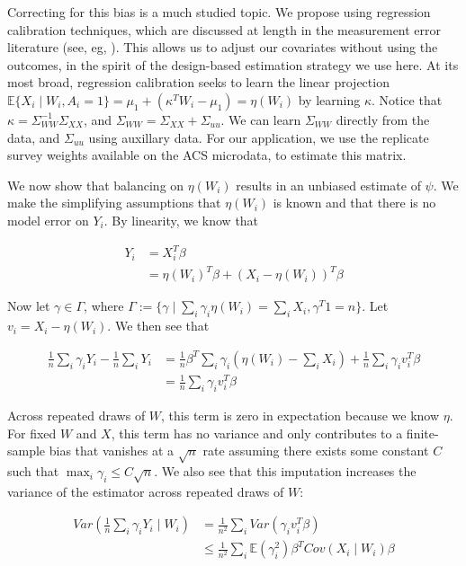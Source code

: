 \documentclass[12pt]{article}
\begin{document}
Correcting for this bias is a much studied topic. We propose using regression calibration techniques, which are discussed at length in the measurement error literature (see, eg, \cite{carroll2006measurement}). This allows us to adjust our covariates without using the outcomes, in the spirit of the design-based estimation strategy we use here. At its most broad, regression calibration seeks to learn the linear projection $\mathbb{E}\{X_i \mid W_i, A_i = 1\} = \mu_1 + (\kappa^T W_i - \mu_1) = \eta(W_i)$ by learning $\kappa$. Notice that $\kappa = \Sigma_{WW}^{-1}\Sigma_{XX}$, and $\Sigma_{WW} = \Sigma_{XX} + \Sigma_{uu}$. We can learn $\Sigma_{WW}$ directly from the data, and $\Sigma_{uu}$ using auxillary data. For our application, we use the replicate survey weights available on the ACS microdata, to estimate this matrix. 

We now show that balancing on $\eta(W_i)$ results in an unbiased estimate of $\psi$. We make the simplifying assumptions that $\eta(W_i)$ is known and that there is no model error on $Y_i$. By linearity, we know that

\begin{align*}
Y_i &= X_i^T\beta \\
&= \eta(W_i)^T\beta + (X_i - \eta(W_i))^T\beta
\end{align*}

Now let $\gamma \in \Gamma$, where $\Gamma := \{\gamma \mid \sum_i \gamma_i \eta(W_i) = \sum_i X_i, \gamma^T1 = n\}$. Let $v_i = X_i - \eta(W_i)$. We then see that

\begin{align*}
    \frac{1}{n}\sum_{i}\gamma_{i}Y_{i} - \frac{1}{n}\sum_{i}Y_{i} &= \frac{1}{n}\beta^T\sum_{i}\gamma_{i}(\eta(W_i) - \sum_{i}X_{i}) + \frac{1}{n}\sum_i \gamma_iv_i^T\beta \\
    &= \frac{1}{n}\sum_i \gamma_iv_i^T\beta
\end{align*}

Across repeated draws of $W$, this term is zero in expectation because we know $\eta$. For fixed $W$ and $X$, this term has no variance and only contributes to a finite-sample bias that vanishes at a $\sqrt{n}$ rate assuming there exists some constant $C$ such that $\max_i \gamma_i \le C\sqrt{n}$. We also see that this imputation increases the variance of the estimator across repeated draws of $W$:

\begin{align*}
    Var(\frac{1}{n}\sum_i \gamma_i Y_i \mid W_i) &= \frac{1}{n^2}\sum_i Var(\gamma_iv_i^T\beta) \\
    &\le \frac{1}{n^2}\sum_i\mathbb{E}(\gamma_i^2)\beta^TCov(X_i \mid W_i)\beta 
\end{align*}
\end{document}
